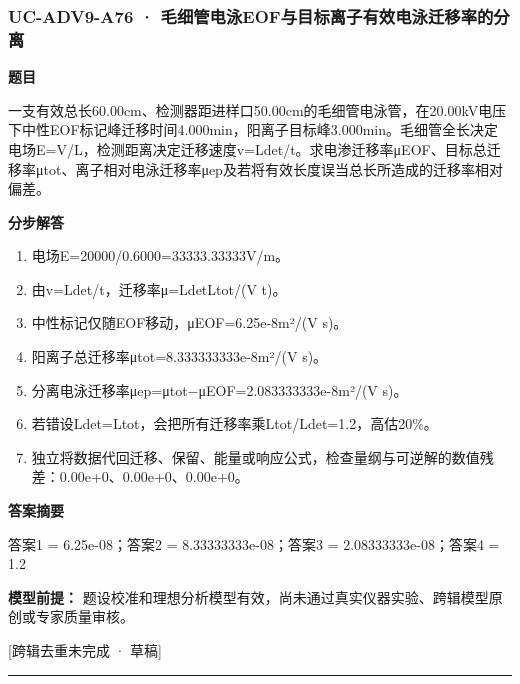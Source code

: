 \documentclass[UTF8,11pt,a4paper]{ctexart}
\begin{document}
\subsubsection*{UC-ADV9-A76 · 毛细管电泳EOF与目标离子有效电泳迁移率的分离}
\noindent\textbf{题目}\par
一支有效总长60.00cm、检测器距进样口50.00cm的毛细管电泳管，在20.00kV电压下中性EOF标记峰迁移时间4.000min，阳离子目标峰3.000min。毛细管全长决定电场E=V/L，检测距离决定迁移速度v=Ldet/t。求电渗迁移率μEOF、目标总迁移率μtot、离子相对电泳迁移率μep及若将有效长度误当总长所造成的迁移率相对偏差。\par
\medskip\noindent\textbf{分步解答}
\begin{enumerate}
\item 电场E=20000/0.6000=33333.33333V/m。
\item 由v=Ldet/t，迁移率μ=LdetLtot/(V t)。
\item 中性标记仅随EOF移动，μEOF=6.25e-8m²/(V s)。
\item 阳离子总迁移率μtot=8.333333333e-8m²/(V s)。
\item 分离电泳迁移率μep=μtot−μEOF=2.083333333e-8m²/(V s)。
\item 若错设Ldet=Ltot，会把所有迁移率乘Ltot/Ldet=1.2，高估20\%。
\item 独立将数据代回迁移、保留、能量或响应公式，检查量纲与可逆解的数值残差：0.00e+0、0.00e+0、0.00e+0。
\end{enumerate}
\noindent\textbf{答案摘要}\par
答案1 = 6.25e-08；答案2 = 8.33333333e-08；答案3 = 2.08333333e-08；答案4 = 1.2\par
\noindent\textbf{模型前提：}
题设校准和理想分析模型有效，尚未通过真实仪器实验、跨辑模型原创或专家质量审核。\par
\noindent\textcolor{red!65!black}{[跨辑去重未完成 · 草稿]} \par
\medskip\hrule\medskip
{}
\end{document}
